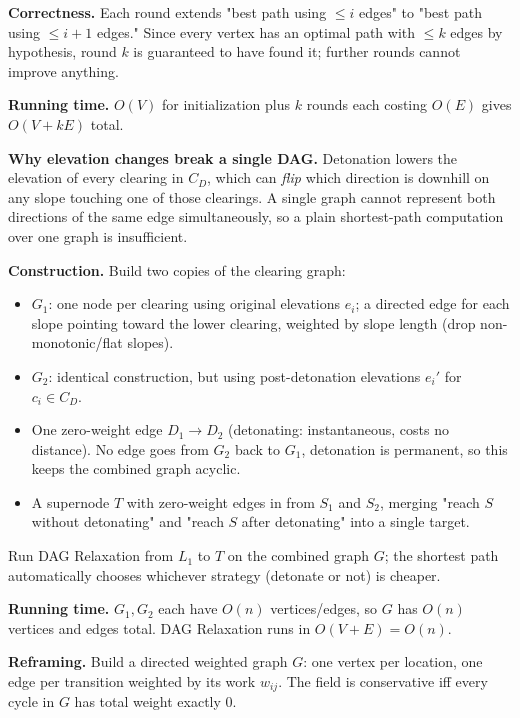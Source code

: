 \documentclass[12pt,twoside]{article}
\begin{document}
\begin{problems}
\textbf{Correctness.} Each round extends "best path using $\le i$ edges" to
"best path using $\le i+1$ edges." Since every vertex has an optimal path with
$\le k$ edges by hypothesis, round $k$ is guaranteed to have found it; further
rounds cannot improve anything.

\textbf{Running time.} $O(V)$ for initialization plus $k$ rounds each costing
$O(E)$ gives $O(V+kE)$ total.

\newpage

\problem  %
\textbf{Why elevation changes break a single DAG.} Detonation lowers the
elevation of every clearing in $C_D$, which can \emph{flip} which direction is downhill on any slope touching one of those clearings. A single graph cannot represent both directions of the same edge simultaneously, so a plain shortest-path computation over one graph is
insufficient.

\textbf{Construction.} Build two copies of the clearing graph:
\begin{itemize}
  \item $G_1$: one node per clearing using original elevations $e_i$; a
  directed edge for each slope pointing toward the lower clearing, weighted by
  slope length (drop non-monotonic/flat slopes).
  \item $G_2$: identical construction, but using post-detonation elevations
  $e_i'$ for $c_i \in C_D$.
  \item One zero-weight edge $D_1 \to D_2$ (detonating: instantaneous, costs
  no distance). No edge goes from $G_2$ back to $G_1$, detonation is
  permanent, so this keeps the combined graph acyclic.
  \item A supernode $T$ with zero-weight edges in from $S_1$ and $S_2$,
  merging "reach $S$ without detonating" and "reach $S$ after detonating"
  into a single target.
\end{itemize}

Run DAG Relaxation from $L_1$ to $T$ on the combined graph $G$; the shortest
path automatically chooses whichever strategy (detonate or not) is cheaper.

\textbf{Running time.} $G_1,G_2$ each have $O(n)$ vertices/edges, so $G$ has
$O(n)$ vertices and edges total. DAG Relaxation runs in $O(V+E)=O(n)$.

\problem  %
\textbf{Reframing.} Build a directed weighted graph $G$: one vertex per
location, one edge per transition weighted by its work $w_{ij}$. The field is
conservative iff every cycle in $G$ has total weight exactly $0$.


\end{problems}
\end{document}
